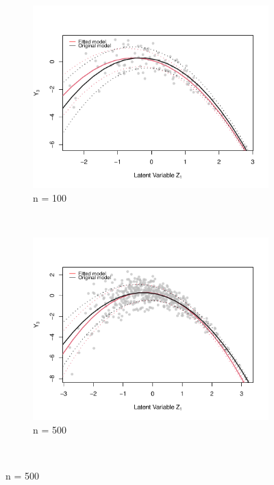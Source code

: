 \documentclass[11pt, a4paper]{article}
\begin{document}
\begin{figure}
\centering
\begin{subfigure}[b]{0.3\textwidth}
    \includegraphics[width=\textwidth]{n100_GausHTQT}
    \caption{n = 100}
    \label{fig:Sim1n100}
\end{subfigure}
~ %
\begin{subfigure}[b]{0.3\textwidth}
    \includegraphics[width=\textwidth]{n500_GausQTHT}
    \caption{n = 500}
    \label{fig:Sim1n500}
\end{subfigure}
~ %

\end{figure}
\end{document}
